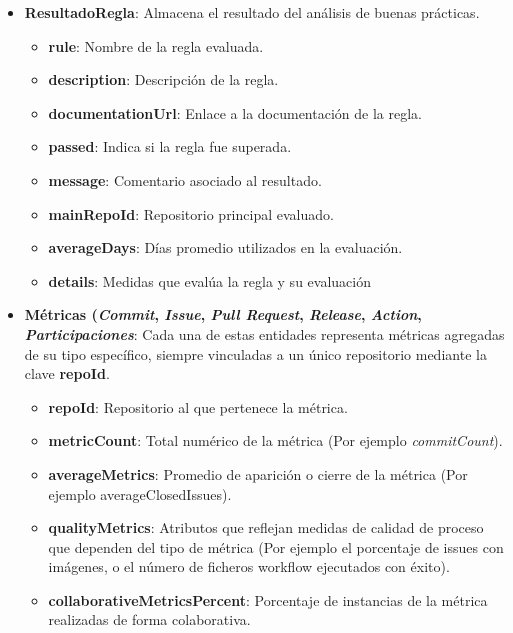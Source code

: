 \begin{itemize}
	\item \textbf{ResultadoRegla}: Almacena el resultado del análisis de buenas prácticas.
		\begin{itemize}
			\item \textbf{rule}: Nombre de la regla evaluada.
			\item \textbf{description}: Descripción de la regla.
			\item \textbf{documentationUrl}: Enlace a la documentación de la regla.
			\item \textbf{passed}: Indica si la regla fue superada.
			\item \textbf{message}: Comentario asociado al resultado.
			\item \textbf{mainRepoId}: Repositorio principal evaluado.
			\item \textbf{averageDays}: Días promedio utilizados en la evaluación.
            \item \textbf{details}: Medidas que evalúa la regla y su evaluación
		\end{itemize}

	\item \textbf{Métricas (\textit{Commit}, \textit{Issue}, \textit{Pull Request}, \textit{Release}, \textit{Action}, \textit{Participaciones}}: Cada una de estas entidades representa métricas agregadas de su tipo específico, siempre vinculadas a un único repositorio mediante la clave \textbf{repoId}.
		\begin{itemize}
			\item \textbf{repoId}: Repositorio al que pertenece la métrica.
			\item \textbf{metricCount}: Total numérico de la métrica (Por ejemplo \textit{commitCount}).
			\item \textbf{averageMetrics}: Promedio de aparición o cierre de la métrica (Por ejemplo averageClosedIssues).
			\item \textbf{qualityMetrics}: Atributos que reflejan medidas de calidad de proceso que dependen del tipo de métrica (Por ejemplo el porcentaje de issues con imágenes, o el número de ficheros workflow ejecutados con éxito).
			\item \textbf{collaborativeMetricsPercent}: Porcentaje de instancias de la métrica realizadas de forma colaborativa.
		\end{itemize}
    \end{itemize}

